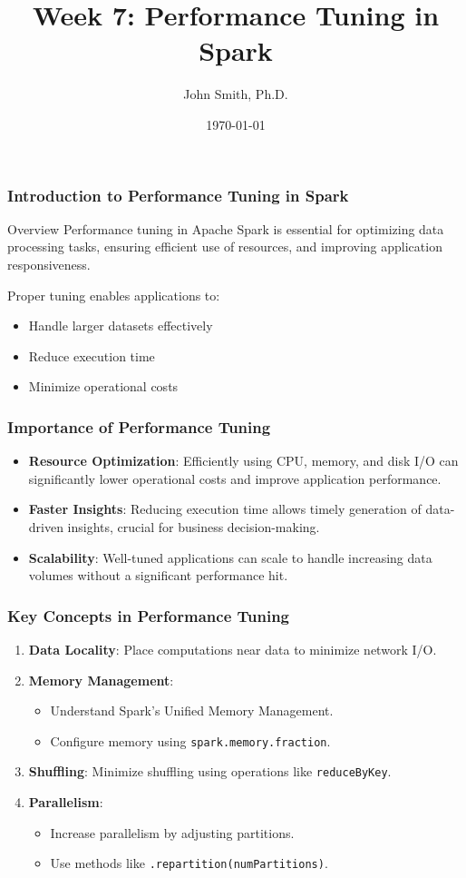 \documentclass[aspectratio=169]{beamer}
\title[Performance Tuning in Spark]{Week 7: Performance Tuning in Spark}
\author[J. Smith]{John Smith, Ph.D.}
\institute[University Name]{
  Department of Computer Science\\
  University Name\\
  \vspace{0.3cm}
  Email: email@university.edu\\
  Website: www.university.edu
}
\date{\today}
\begin{document}
\frame{\titlepage}

\begin{frame}[fragile]
    \frametitle{Introduction to Performance Tuning in Spark}
    \begin{block}{Overview}
        Performance tuning in Apache Spark is essential for optimizing data processing tasks, ensuring efficient use of resources, and improving application responsiveness.
    \end{block}
    Proper tuning enables applications to:
    \begin{itemize}
        \item Handle larger datasets effectively
        \item Reduce execution time
        \item Minimize operational costs
    \end{itemize}
\end{frame}

\begin{frame}[fragile]
    \frametitle{Importance of Performance Tuning}
    \begin{itemize}
        \item \textbf{Resource Optimization}: Efficiently using CPU, memory, and disk I/O can significantly lower operational costs and improve application performance.
        \item \textbf{Faster Insights}: Reducing execution time allows timely generation of data-driven insights, crucial for business decision-making.
        \item \textbf{Scalability}: Well-tuned applications can scale to handle increasing data volumes without a significant performance hit.
    \end{itemize}
\end{frame}

\begin{frame}[fragile]
    \frametitle{Key Concepts in Performance Tuning}
    \begin{enumerate}
        \item \textbf{Data Locality}: Place computations near data to minimize network I/O.
        \item \textbf{Memory Management}:
        \begin{itemize}
            \item Understand Spark's Unified Memory Management.
            \item Configure memory using \texttt{spark.memory.fraction}.
        \end{itemize}
        \item \textbf{Shuffling}: Minimize shuffling using operations like \texttt{reduceByKey}.
        \item \textbf{Parallelism}:
        \begin{itemize}
            \item Increase parallelism by adjusting partitions.
            \item Use methods like \texttt{.repartition(numPartitions)}.
        \end{itemize}
    \end{enumerate}
\end{frame}
\end{document}
